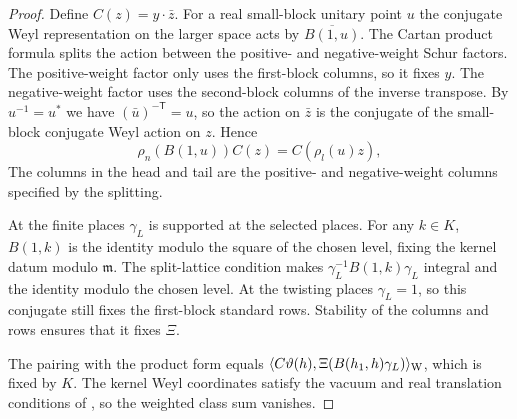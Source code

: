 \begin{proof}
Define $C(z)=y\cdot\bar z$. For a real small-block unitary point $u$ the conjugate Weyl representation on the larger space acts by $\overline{B(1,u)}$. The Cartan product formula splits the action between the positive- and negative-weight Schur factors. The positive-weight factor only uses the first-block columns, so it fixes $y$. The negative-weight factor uses the second-block columns of the inverse transpose. By $u^{-1}=u^*$ we have $(\bar u)^{-\mathsf T}=u$, so the action on $\bar z$ is the conjugate of the small-block conjugate Weyl action on $z$. Hence
\[
     \rho_n(B(1,u))C(z)=C(\rho_l(u)z),
\]
The columns in the head and tail are the positive- and negative-weight columns specified by the splitting.

At the finite places $\gamma_L$ is supported at the selected places. For any $k\in K$, $B(1,k)$ is the identity modulo the square of the chosen level, fixing the kernel datum modulo $\mathfrak m$. The split-lattice condition makes $\gamma_L^{-1}B(1,k)\gamma_L$ integral and the identity modulo the chosen level. At the twisting places $\gamma_L=1$, so this conjugate still fixes the first-block standard rows. Stability of the columns and rows ensures that it fixes $\Xi$.

The pairing with the product form equals $\langle C\vartheta(h),\Xi(B(h_1,h)\gamma_L)\rangle_{\rm W}$, which is fixed by $K$. The kernel Weyl coordinates satisfy the vacuum and real translation conditions of , so the weighted class sum vanishes.
\end{proof}

